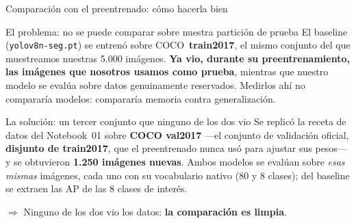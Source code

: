 \documentclass[aspectratio=169,11pt]{beamer}
\begin{document}
\begin{frame}{Comparación con el preentrenado: cómo hacerla bien}
  \begin{alertblock}{El problema: no se puede comparar sobre nuestra partición de prueba}
    \footnotesize
    El baseline (\texttt{yolov8n-seg.pt}) se entrenó sobre COCO~\textbf{train2017}, el mismo
    conjunto del que muestreamos nuestras 5.000 imágenes. \textbf{Ya vio, durante su
    preentrenamiento, las imágenes que nosotros usamos como prueba}, mientras que nuestro
    modelo se evalúa sobre datos genuinamente reservados. Medirlos ahí no compararía
    modelos: compararía memoria contra generalización.
  \end{alertblock}

  \vspace{0.5em}
  \begin{exampleblock}{La solución: un tercer conjunto que ninguno de los dos vio}
    \footnotesize
    Se replicó la receta de datos del Notebook~01 sobre \textbf{COCO val2017} ---el conjunto
    de validación oficial, \textbf{disjunto de train2017}, que el preentrenado nunca usó
    para ajustar sus pesos--- y se obtuvieron \textbf{1.250 imágenes nuevas}. Ambos modelos
    se evalúan sobre \emph{esas mismas} imágenes, cada uno con su vocabulario nativo (80 y 8
    clases); del baseline se extraen las AP de las 8 clases de interés.
    \vspace{0.3em}

    $\Rightarrow$ Ninguno de los dos vio los datos: \textbf{la comparación es limpia}.
  \end{exampleblock}
\end{frame}
\end{document}
